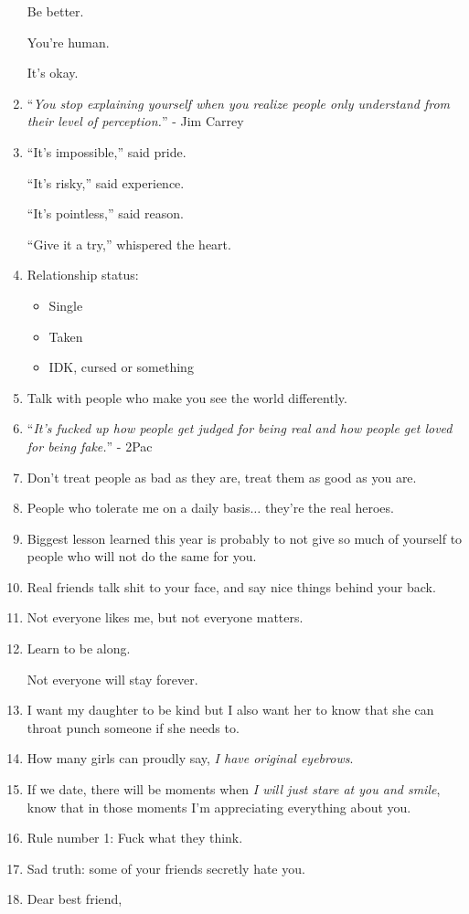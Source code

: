 \documentclass{article}
\begin{document}
\begin{enumerate}
	Be better.
	
	You're human.
	
	It's okay.
	\item ``\textit{You stop explaining yourself when you realize people only understand from their level of perception.}'' - Jim Carrey
	\item ``It's impossible,'' said pride.
	
	``It's risky,'' said experience.
	
	``It's pointless,'' said reason.
	
	``Give it a try,'' whispered the heart.
	\item Relationship status:
	\begin{itemize}
		\item Single
		\item Taken
		\item IDK, cursed or something
	\end{itemize}
	\item Talk with people who make you see the world differently.
	\item ``\textit{It's fucked up how people get judged for being real and how people get loved for being fake.}'' - 2Pac
	\item Don't treat people as bad as they are, treat them as good as you are.
	\item People who tolerate me on a daily basis$\ldots$ they're the real heroes.
	\item Biggest lesson learned this year is probably to not give so much of yourself to people who will not do the same for you.
	\item Real friends talk shit to your face, and say nice things behind your back.
	\item Not everyone likes me, but not everyone matters.
	\item Learn to be along.
	
	Not everyone will stay forever.
	\item I want my daughter to be kind but I also want her to know that she can throat punch someone if she needs to.
	\item How many girls can proudly say, \textit{I have original eyebrows}.
	\item If we date, there will be moments when \textit{I will just stare at you and smile}, know that in those moments I'm appreciating everything about you.
	\item Rule number 1: Fuck what they think.
	\item Sad truth: some of your friends secretly hate you.
	\item Dear best friend,
	

\end{enumerate}
\end{document}
